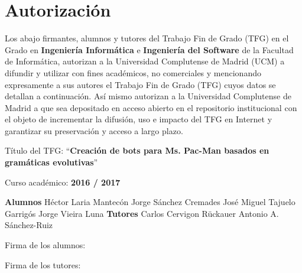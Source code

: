 \chapter{Autorización} \label{cap:autorizacion}
Los abajo firmantes, alumnos y tutores del Trabajo Fin de Grado (TFG) en el Grado en \textbf{Ingeniería Informática} e \textbf{Ingeniería del Software} de la Facultad de Informática, autorizan a la Universidad Complutense de Madrid (UCM) a difundir y utilizar con fines académicos, no comerciales y mencionando expresamente a sus autores el Trabajo Fin de Grado (TFG) cuyos datos se detallan a continuación. Así mismo autorizan a la Universidad Complutense de Madrid a que sea depositado en acceso abierto en el repositorio institucional con el objeto de incrementar la difusión, uso e impacto del TFG en Internet y garantizar su preservación y acceso a largo plazo.
 
Título del TFG: ``\textbf{Creación de bots para Ms. Pac-Man basados en gramáticas evolutivas}''
 
Curso académico: \textbf{2016 / 2017}

           \textbf{Alumnos}
Héctor Laria Mantecón     Jorge Sánchez Cremades 
José Miguel Tajuelo Garrigós    Jorge Vieira Luna
\textbf{Tutores}
Carlos Cervigon Rückauer     Antonio A. Sánchez-Ruiz

Firma de los alumnos:

Firma de los tutores:
